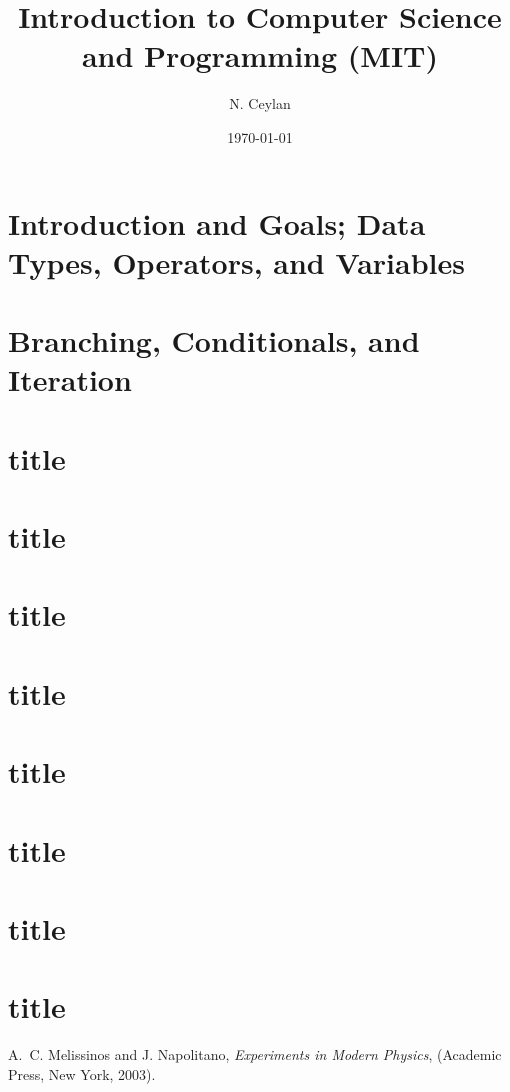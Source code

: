 \documentclass[letterpaper,12pt]{article}
\begin{document}
\title{Introduction to Computer Science and Programming (MIT) }
\author{N. Ceylan}
\date{\today}
\maketitle






\section{Introduction and Goals; Data Types, Operators, and Variables}


\section{Branching, Conditionals, and Iteration}
\section{title}


\section{title}


\section{title}
\section{title}

\section{title}

\section{title}

\section{title}

\section{title}



\begin{thebibliography}{99}
	
	A.~C. Melissinos and J. Napolitano, \textit{Experiments in Modern Physics},
	(Academic Press, New York, 2003).
\end{thebibliography}
\end{document}
